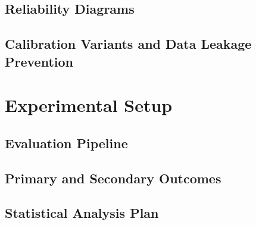\documentclass[runningheads]{llncs}
\begin{document}
\subsection{Reliability Diagrams}

\subsection{Calibration Variants and Data Leakage Prevention}

\section{Experimental Setup}
\subsection{Evaluation Pipeline}

\subsection{Primary and Secondary Outcomes}

\subsection{Statistical Analysis Plan}
\end{document}
